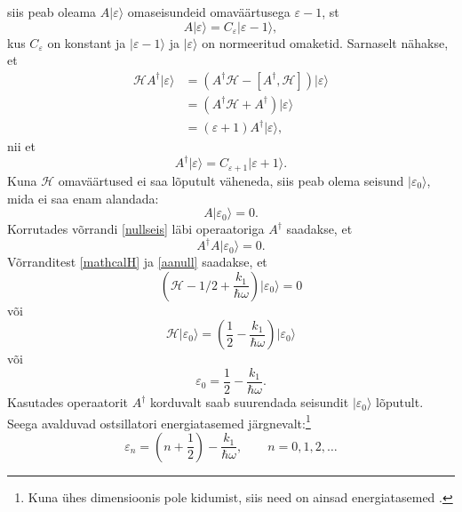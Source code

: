 \documentclass{trkut}%
\renewcommand\ket[1]{{|{#1}\rangle}}
\begin{document}
siis peab oleama $A\ket{\varepsilon}$ omaseisundeid omaväärtusega $\varepsilon - 1$, st
\begin{equation}
    A\ket{\varepsilon}=C_\varepsilon \ket{\varepsilon -1},
    \label{cepsilon}
\end{equation}
kus $C_\varepsilon$ on konstant ja $\ket{\varepsilon -1}$ ja $\ket{\varepsilon}$ on normeeritud omaketid.
Sarnaselt nähakse, et
\begin{align}
    \mathcal{H}A^\dagger\ket{\varepsilon}&=\left(A^\dagger\mathcal{H}-[A^\dagger, \mathcal{H}]\right)\ket{\varepsilon} \nonumber \\
    &=(A^\dagger\mathcal{H}+A^\dagger)\ket{\varepsilon} \nonumber \\
    &=(\varepsilon + 1)A^\dagger\ket{\varepsilon},
\end{align}
nii et
\begin{equation}
    A^\dagger\ket{\varepsilon}=C_{\varepsilon+1} \ket{\varepsilon+1}.
    \label{cepsilon1}
\end{equation}
Kuna $\mathcal{H}$ omaväärtused ei saa lõputult väheneda, siis peab olema seisund $\ket{\varepsilon_0}$, mida ei saa enam alandada:
\begin{equation}
    A\ket{\varepsilon_0}=0.
    \label{nullseis}
\end{equation}
Korrutades võrrandi \eqref{nullseis} läbi operaatoriga $A^\dagger$ saadakse, et
\begin{equation}
    A^\dagger A\ket{\varepsilon_0}=0.
    \label{aanull}
\end{equation}
Võrranditest \eqref{mathcalH} ja \eqref{aanull} saadakse, et
\begin{equation}
    \left(\mathcal{H}-1/2 + \frac{k_1}{\hbar \omega} \right)\ket{\varepsilon_0}=0
\end{equation}
või
\begin{equation}
    \mathcal{H}\ket{\varepsilon_0}=\left(\frac{1}{2} - \frac{k_1}{\hbar \omega}\right) \ket{\varepsilon_0}
\end{equation}
või
\begin{equation}
    \varepsilon_0=\frac{1}{2} - \frac{k_1}{\hbar \omega}.
\end{equation}
Kasutades operaatorit $A^\dagger$ korduvalt saab suurendada seisundit $\ket{\varepsilon_0}$ lõputult. Seega avalduvad ostsillatori energiatasemed järgnevalt:\footnote{Kuna ühes dimensioonis pole kidumist, siis need on ainsad energiatasemed \parencite[176-177]{shankar94}.}
\begin{equation}
    \varepsilon_n=\left(n+\frac{1}{2}\right)-\frac{k_1}{\hbar \omega}, \qquad n=0, 1, 2,\dots
\end{equation}
\end{document}
